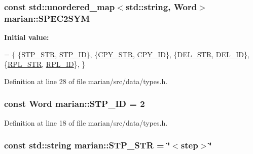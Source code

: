 \subsubsection[{\texorpdfstring{S\+P\+E\+C2\+S\+YM}{SPEC2SYM}}]{\setlength{\rightskip}{0pt plus 5cm}const std\+::unordered\+\_\+map$<$std\+::string, {\bf Word}$>$ marian\+::\+S\+P\+E\+C2\+S\+YM}\hypertarget{namespacemarian_a53db7e8e290296787decc0fd95948535}{}\label{namespacemarian_a53db7e8e290296787decc0fd95948535}
{\bfseries Initial value\+:}
\begin{DoxyCode}
= \{
    \{\hyperlink{namespacemarian_ac2ced42d12025e2b9688b345ac777ea7}{STP\_STR}, \hyperlink{namespacemarian_a5a9abba7ca69af7bf465e68f8f7169c5}{STP\_ID}\}, \{\hyperlink{namespacemarian_aafe70f6fe2652d0c8712f08bc4e2c8f6}{CPY\_STR}, \hyperlink{namespacemarian_a332a04943d2fc4bba824afc099e46190}{CPY\_ID}\}, \{\hyperlink{namespacemarian_aa9c98f79752cd2294cae93a90ffcf9d3}{DEL\_STR}, 
      \hyperlink{namespacemarian_a3602e294027f4df7aeba04dd25e83db6}{DEL\_ID}\}, \{\hyperlink{namespacemarian_a0609886bc1d9c2f4fc75e5e9fc6905ad}{RPL\_STR}, \hyperlink{namespacemarian_ae421bed2a0160f392a3c21bed9cabc73}{RPL\_ID}\},
\}
\end{DoxyCode}


Definition at line 28 of file marian/src/data/types.\+h.

\subsubsection[{\texorpdfstring{S\+T\+P\+\_\+\+ID}{STP_ID}}]{\setlength{\rightskip}{0pt plus 5cm}const {\bf Word} marian\+::\+S\+T\+P\+\_\+\+ID = 2}\hypertarget{namespacemarian_a5a9abba7ca69af7bf465e68f8f7169c5}{}\label{namespacemarian_a5a9abba7ca69af7bf465e68f8f7169c5}


Definition at line 18 of file marian/src/data/types.\+h.

\subsubsection[{\texorpdfstring{S\+T\+P\+\_\+\+S\+TR}{STP_STR}}]{\setlength{\rightskip}{0pt plus 5cm}const std\+::string marian\+::\+S\+T\+P\+\_\+\+S\+TR = \char`\"{}$<$step$>$\char`\"{}}\hypertarget{namespacemarian_ac2ced42d12025e2b9688b345ac777ea7}{}\label{namespacemarian_ac2ced42d12025e2b9688b345ac777ea7}


